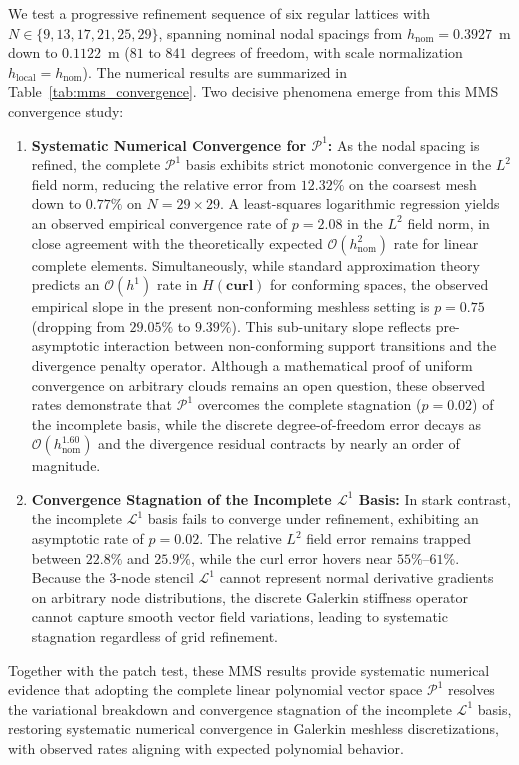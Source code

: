 \documentclass[preprint,12pt]{elsarticle}
\begin{document}
We test a progressive refinement sequence of six regular lattices with $N \in \{9, 13, 17, 21, 25, 29\}$, spanning nominal nodal spacings from $h_{\mathrm{nom}} = 0.3927$~m down to $0.1122$~m ($81$ to $841$ degrees of freedom, with scale normalization $h_{\mathrm{local}} = h_{\mathrm{nom}}$). The numerical results are summarized in Table~\ref{tab:mms_convergence}. Two decisive phenomena emerge from this MMS convergence study:
\begin{enumerate}
    \item \textbf{Systematic Numerical Convergence for $\mathcal{P}^1$:} As the nodal spacing is refined, the complete $\mathcal{P}^1$ basis exhibits strict monotonic convergence in the $L^2$ field norm, reducing the relative error from $12.32\%$ on the coarsest mesh down to $0.77\%$ on $N = 29 \times 29$. A least-squares logarithmic regression yields an observed empirical convergence rate of $p = 2.08$ in the $L^2$ field norm, in close agreement with the theoretically expected $\mathcal{O}(h_{\mathrm{nom}}^2)$ rate for linear complete elements. Simultaneously, while standard approximation theory predicts an $\mathcal{O}(h^1)$ rate in $H(\mathbf{curl})$ for conforming spaces, the observed empirical slope in the present non-conforming meshless setting is $p = 0.75$ (dropping from $29.05\%$ to $9.39\%$). This sub-unitary slope reflects pre-asymptotic interaction between non-conforming support transitions and the divergence penalty operator. Although a mathematical proof of uniform convergence on arbitrary clouds remains an open question, these observed rates demonstrate that $\mathcal{P}^1$ overcomes the complete stagnation ($p = 0.02$) of the incomplete basis, while the discrete degree-of-freedom error decays as $\mathcal{O}(h_{\mathrm{nom}}^{1.60})$ and the divergence residual contracts by nearly an order of magnitude.
    \item \textbf{Convergence Stagnation of the Incomplete $\mathcal{L}^1$ Basis:} In stark contrast, the incomplete $\mathcal{L}^1$ basis fails to converge under refinement, exhibiting an asymptotic rate of $p = 0.02$. The relative $L^2$ field error remains trapped between $22.8\%$ and $25.9\%$, while the curl error hovers near $55\%\text{--}61\%$. Because the 3-node stencil $\mathcal{L}^1$ cannot represent normal derivative gradients on arbitrary node distributions, the discrete Galerkin stiffness operator cannot capture smooth vector field variations, leading to systematic stagnation regardless of grid refinement.
\end{enumerate}
Together with the patch test, these MMS results provide systematic numerical evidence that adopting the complete linear polynomial vector space $\mathcal{P}^1$ resolves the variational breakdown and convergence stagnation of the incomplete $\mathcal{L}^1$ basis, restoring systematic numerical convergence in Galerkin meshless discretizations, with observed rates aligning with expected polynomial behavior.
\end{document}

